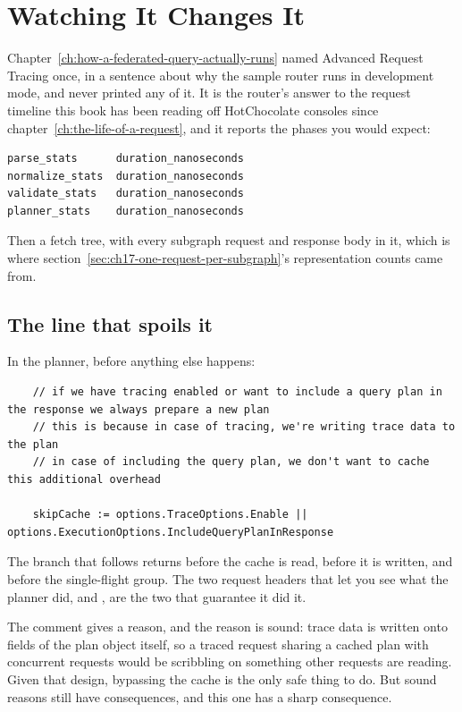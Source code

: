 \section{Watching It Changes It}
\label{sec:ch17-watching-it-changes-it}
%

Chapter~\ref{ch:how-a-federated-query-actually-runs} named Advanced Request
Tracing once, in a sentence about why the sample router runs in development
mode, and never printed any of it. It is the router's answer to the request
timeline this book has been reading off HotChocolate consoles since
chapter~\ref{ch:the-life-of-a-request}, and it reports the phases you would
expect:

\begin{verbatim}
parse_stats      duration_nanoseconds
normalize_stats  duration_nanoseconds
validate_stats   duration_nanoseconds
planner_stats    duration_nanoseconds
\end{verbatim}

Then a fetch tree, with every subgraph request and response body in it, which is
where section~\ref{sec:ch17-one-request-per-subgraph}'s representation counts
came from.

\subsection*{The line that spoils it}

%
In the planner, before anything else happens:

\begin{verbatim}
	// if we have tracing enabled or want to include a query plan in the response we always prepare a new plan
	// this is because in case of tracing, we're writing trace data to the plan
	// in case of including the query plan, we don't want to cache this additional overhead

	skipCache := options.TraceOptions.Enable || options.ExecutionOptions.IncludeQueryPlanInResponse
\end{verbatim}

The branch that follows returns before the cache is read, before it is written,
and before the single-flight group. The two request headers that let you see
what the planner did,  and , are
the two that guarantee it did it.

%
The comment gives a reason, and the reason is sound: trace data is written onto
fields of the plan object itself, so a traced request sharing a cached plan with
concurrent requests would be scribbling on something other requests are reading.
Given that design, bypassing the cache is the only safe thing to do. But sound
reasons still have consequences, and this one has a sharp consequence.

